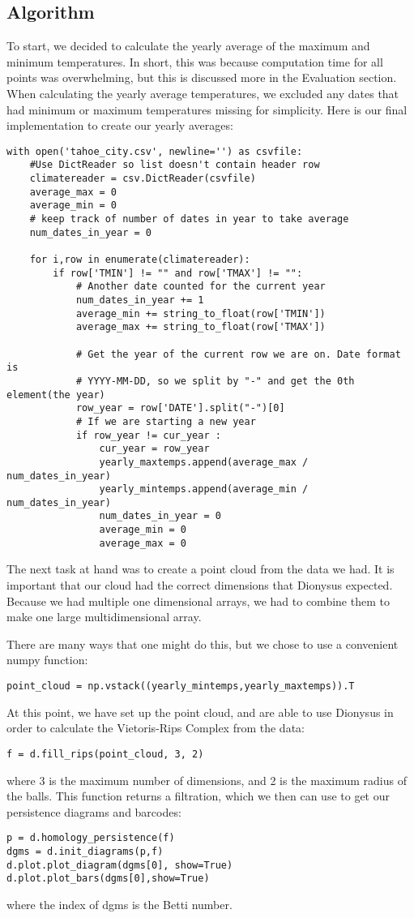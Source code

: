 \documentclass[12pt]{report}
\begin{document}
\subsection*{Algorithm}
To start, we decided to calculate the yearly average of the maximum and minimum temperatures. In short, this was because computation time for all points was overwhelming, but this is discussed more in the Evaluation section. When calculating the yearly average temperatures, we excluded any dates that had minimum or maximum temperatures missing for simplicity. Here is our final implementation to create our yearly averages:
\begin{lstlisting}
with open('tahoe_city.csv', newline='') as csvfile:
    #Use DictReader so list doesn't contain header row 
    climatereader = csv.DictReader(csvfile)
    average_max = 0
    average_min = 0
    # keep track of number of dates in year to take average
    num_dates_in_year = 0

    for i,row in enumerate(climatereader):
        if row['TMIN'] != "" and row['TMAX'] != "":
            # Another date counted for the current year
            num_dates_in_year += 1
            average_min += string_to_float(row['TMIN'])
            average_max += string_to_float(row['TMAX'])

            # Get the year of the current row we are on. Date format is 
            # YYYY-MM-DD, so we split by "-" and get the 0th element(the year)
            row_year = row['DATE'].split("-")[0]
            # If we are starting a new year
            if row_year != cur_year :
                cur_year = row_year
                yearly_maxtemps.append(average_max / num_dates_in_year)
                yearly_mintemps.append(average_min / num_dates_in_year)
                num_dates_in_year = 0
                average_min = 0
                average_max = 0
\end{lstlisting}
The next task at hand was to create a point cloud from the data we had. It is important that our cloud had the correct dimensions that Dionysus expected. Because we had multiple one dimensional arrays, we had to combine them to make one large multidimensional array.

There are many ways that one might do this, but we chose to use a convenient numpy function:
\begin{lstlisting}
point_cloud = np.vstack((yearly_mintemps,yearly_maxtemps)).T
\end{lstlisting}
At this point, we have set up the point cloud, and are able to use Dionysus in order to calculate the Vietoris-Rips Complex from the data:
\begin{lstlisting}
f = d.fill_rips(point_cloud, 3, 2)
\end{lstlisting}
where 3 is the maximum number of dimensions, and 2 is the maximum radius of the balls.
This function returns a filtration, which we then can use to get our persistence diagrams and barcodes:
\begin{lstlisting}
p = d.homology_persistence(f)
dgms = d.init_diagrams(p,f)
d.plot.plot_diagram(dgms[0], show=True)
d.plot.plot_bars(dgms[0],show=True)
\end{lstlisting}
where the index of dgms is the Betti number. \par
\end{document}
